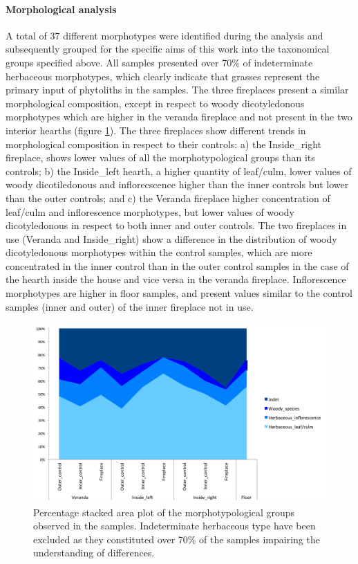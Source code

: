 \documentclass[authoryear,preprint,review,12pt]{elsarticle}
\begin{document}
\paragraph{Morphological analysis}
A total of 37 different morphotypes were identified during the analysis and subsequently grouped for the specific aims of this work into the taxonomical groups specified above. All samples presented over 70\% of indeterminate herbaceous morphotypes, which clearly indicate that grasses represent the primary input of phytoliths in the samples. The three fireplaces present a similar morphological composition, except in respect to woody dicotyledonous morphotypes which are higher in the veranda fireplace and not present in the two interior hearths (figure \ref{fig:morpho}). The three fireplaces show different trends in morphological composition in respect to their controls: a) the Inside\_right fireplace, shows lower values of all the morphotypological groups than its controls; b) the Inside\_left hearth, a higher quantity of leaf/culm, lower values of woody dicotiledonous and inflorecscence higher than the inner controls but lower than the outer controls; and c) the Veranda fireplace higher concentration of leaf/culm and inflorescence morphotypes, but lower values of woody dicotyledonous in respect to both inner and outer controls. The two fireplaces in use (Veranda and Inside\_right) show a difference in the distribution of woody dicotyledonous morphotypes within the control samples, which are more concentrated in the inner control than in the outer control samples in the case of the hearth inside the house and vice versa in the veranda fireplace. Inflorescence morphotypes are higher in floor samples, and present values similar to the control samples (inner and outer) of the inner fireplace not in use.

\begin{figure}[ht!]
  \begin{center}
    \includegraphics[width=15cm]{figures/fp_bar}
    \caption{Percentage stacked area plot of the morphotypological groups observed in the samples. Indeterminate herbaceous type have been excluded as they constituted over 70\% of the samples impairing the understanding of differences.}
    \label{fig:morpho}
  \end{center}
\end{figure}
\end{document}
